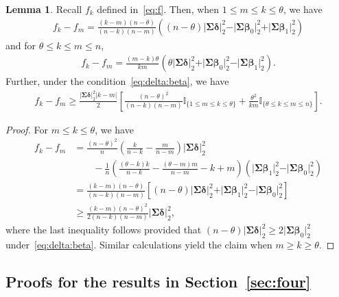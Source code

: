 \documentclass[11pt, a4paper]{article}
\renewcommand{\l}{\left}
\renewcommand{\r}{\right}
\newcommand{\cp}{\theta}
\theoremstyle{definition}
\theoremstyle{definition}
\theoremstyle{definition}
\newtheorem{lem}[thm]{Lemma}
\theoremstyle{definition}
\theoremstyle{definition}
\theoremstyle{remark}
\theoremstyle{definition}
\theoremstyle{definition}
\theoremstyle{definition}
\begin{document}
\begin{lem}
\label{lem:f} Recall $f_k$ defined in~\eqref{eq:f}. Then, when $1 \le m \le k \le \cp$, we have
\begin{align*}
f_k - f_m = \frac{(k - m)(n - \cp)}{(n - k)(n - m)} \l( (n - \cp) \vert \bm\Sigma \bm\delta \vert_2^2 - \vert \bm\Sigma \bm\beta_0 \vert_2^2 + \vert \bm\Sigma \bm\beta_1 \vert_2^2 \r)
\end{align*}
and for $\cp \le k \le m \le n$,
\begin{align*}
f_k - f_m = \frac{(m - k)\cp}{km} \l( \cp \vert \bm\Sigma \bm\delta \vert_2^2 + \vert \bm\Sigma \bm\beta_0 \vert_2^2 - \vert \bm\Sigma \bm\beta_1 \vert_2^2 \r).
\end{align*}
Further, under the condition~\eqref{eq:delta:beta}, we have
\begin{align*}
f_k - f_m \ge \frac{\vert \bm\Sigma \bm\delta \vert_2^2 \vert k - m \vert}{2} \l[ \frac{(n - \cp)^2}{(n - k)(n - m)} \mathbb{I}_{\{1 \le m \le k \le \cp \}} + \frac{\cp^2}{km} \mathbb{I}_{\{\cp \le k \le m \le n\}} \r].
\end{align*}
\end{lem}

\begin{proof}
For $m \le k \le \cp$, we have
\begin{align*}
f_k - f_m &= \frac{(n - \cp)^2}{n} \l(\frac{k}{n - k} - \frac{m}{n - m}\r) \vert \bm\Sigma \bm\delta \vert_2^2 
\\
& \qquad - \frac{1}{n}\l( \frac{(\cp - k)k}{n - k} - \frac{(\cp - m)m}{n - m} - k + m \r) \l( \vert \bm\Sigma \bm\beta_1 \vert_2^2 - \vert \bm\Sigma \bm\beta_0 \vert_2^2 \r) 
\\
&= \frac{(k - m)(n - \cp)}{(n - k)(n - m)} \l[ (n - \cp) \vert \bm\Sigma \bm\delta \vert_2^2 + \vert \bm\Sigma \bm\beta_1 \vert_2^2 - \vert \bm\Sigma \bm\beta_0 \vert_2^2 \r]
\\
&\ge \frac{(k - m)(n - \cp)^2}{2(n - k)(n - m)} \vert \bm\Sigma \bm\delta \vert_2^2,
\end{align*}
where the last inequality follows provided that $(n - \cp) \vert \bm\Sigma \bm\delta \vert_2^2 \ge 2 \vert \bm\Sigma \bm\beta_0 \vert_2^2$ under~\eqref{eq:delta:beta}.
Similar calculations yield the claim when $m \ge k \ge \cp$.
\end{proof}

\subsection{Proofs for the results in Section~\ref{sec:four}}
\end{document}
